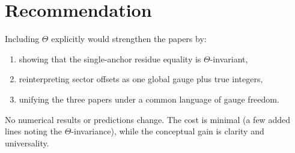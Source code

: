 \documentclass[12pt]{article}
\begin{document}
\section*{Recommendation}
Including $\Theta$ explicitly would strengthen the papers by:
\begin{enumerate}
  \item showing that the single-anchor residue equality is $\Theta$-invariant,
  \item reinterpreting sector offsets as one global gauge plus true integers,
  \item unifying the three papers under a common language of gauge freedom.
\end{enumerate}
No numerical results or predictions change. The cost is minimal (a few added lines noting the $\Theta$-invariance), while the conceptual gain is clarity and universality.
\end{document}
